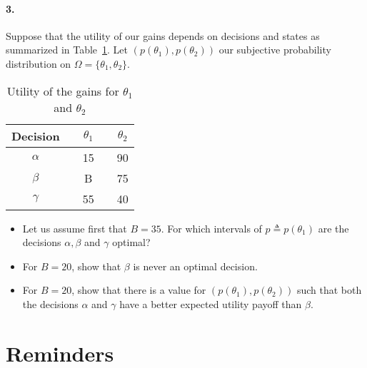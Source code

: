 \documentclass[a4paper,notitlepage,12pt]{article}
\begin{document}
\paragraph{3. } Suppose that the utility of our gains depends on decisions and states as summarized in Table~\ref{ex7}. Let $(p(\theta_1), p(\theta_2))$ our subjective probability distribution on $\Omega = \{ \theta_1, \theta_2 \}$.
\begin{table}[h!]
	\begin{center}
		\begin{tabular}{ccccc}
			\hline
			Decision & & $\theta_1$ & & $\theta_2$ \\
			\hline
			$\alpha$ & & 15 & & 90 \\
			$\beta$ & & B & & 75 \\
			$\gamma$ & & 55 & & 40 \\
			\hline
		\end{tabular}
		\caption{Utility of the gains for $\theta_1$ and $\theta_2$} \label{ex7}
	\end{center}
\end{table}
\begin{itemize}
	\item Let us assume first that $B = 35$. For which intervals of $p \triangleq p(\theta_1)$ are the decisions $\alpha, \beta$ and $\gamma$ optimal? %
	\item For $B = 20$, show that $\beta$ is never an optimal decision.
	\item For $B = 20$, show that there is a value for $(p(\theta_1), p(\theta_2))$ such that  both the decisions $\alpha$ and $\gamma$ have a better expected utility payoff than  $\beta$.
\end{itemize}

\section*{Reminders}
\end{document}
